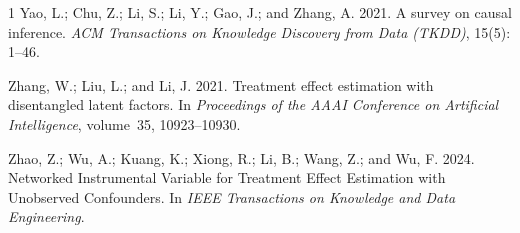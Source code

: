 \documentclass[journal]{IEEEtran}
\begin{document}
\begin{thebibliography}{1}
Yao, L.; Chu, Z.; Li, S.; Li, Y.; Gao, J.; and Zhang, A. 2021.
\newblock A survey on causal inference.
\newblock \emph{ACM Transactions on Knowledge Discovery from Data (TKDD)}, 15(5): 1--46.

Zhang, W.; Liu, L.; and Li, J. 2021.
\newblock Treatment effect estimation with disentangled latent factors.
\newblock In \emph{Proceedings of the AAAI Conference on Artificial Intelligence}, volume~35, 10923--10930.

Zhao, Z.; Wu, A.; Kuang, K.; Xiong, R.; Li, B.; Wang, Z.; and Wu, F. 2024.
\newblock Networked Instrumental Variable for Treatment Effect Estimation with Unobserved Confounders.
\newblock In \emph{IEEE Transactions on Knowledge and Data Engineering}.

\end{thebibliography}
\end{document}
